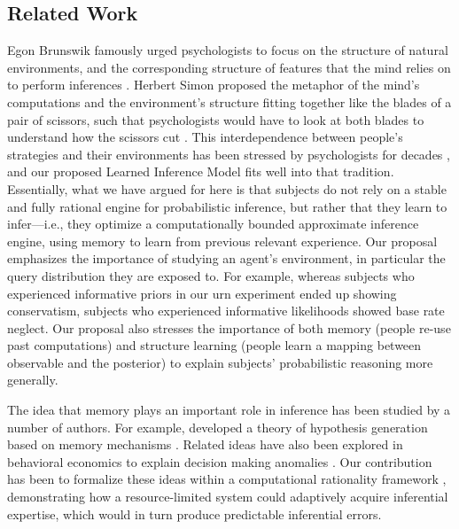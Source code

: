 \subsection{Related Work}

Egon Brunswik famously urged psychologists to focus on the structure of natural environments, and the corresponding structure of features that the mind relies on to perform inferences \citep{brunswik1955representative}. Herbert Simon proposed the metaphor of the mind's computations and the environment's structure fitting together like the blades of a pair of scissors, such that psychologists would have to look at both blades to understand how the scissors cut \citep{simon1955behavioral}. This interdependence between people's strategies and their environments has been stressed by psychologists for decades \citep{todd2007environments}, and our proposed Learned Inference Model fits well into that tradition. Essentially, what we have argued for here is that subjects do not rely on a stable and fully rational engine for probabilistic inference, but rather that they learn to infer---i.e., they optimize a computationally bounded approximate inference engine, using memory to learn from previous relevant experience. Our proposal emphasizes the importance of studying an agent's environment, in particular the query distribution they are exposed to. For example, whereas subjects who experienced informative priors in our urn experiment ended up showing conservatism, subjects who experienced informative likelihoods showed base rate neglect. Our proposal also stresses the importance of both memory (people re-use past computations) and structure learning (people learn a mapping between observable and the posterior) to explain subjects' probabilistic reasoning more generally.

The idea that memory plays an important role in inference has been studied by a number of authors. For example, \citet{thomas2008diagnostic} developed a theory of hypothesis generation based on memory mechanisms \citep[see][for an overview of this research program]{thomas2014memory}. Related ideas have also been explored in behavioral economics to explain decision making anomalies \citep{bordalo2017memory}. Our contribution has been to formalize these ideas within a computational rationality framework \citep{gershman2015computational}, demonstrating how a resource-limited system could adaptively acquire inferential expertise, which would in turn produce predictable inferential errors.

